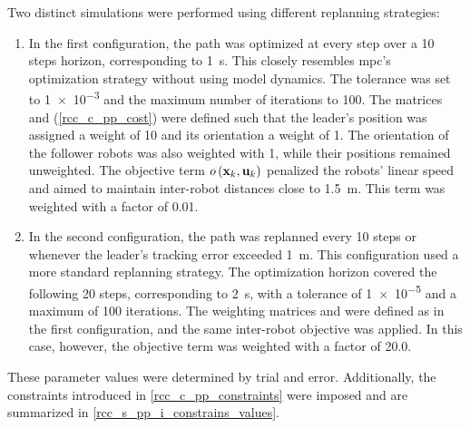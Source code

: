 Two distinct simulations were performed using different replanning strategies:
\begin{enumerate}
	\item In the first configuration, the path was optimized at every step over a \num{10} steps horizon,
	      corresponding to \qty{1}{\second}. This closely resembles \ac{mpc}'s optimization strategy without
	      using model dynamics. The tolerance was set to \num{1e-3} and the maximum number of iterations to
	      \num{100}. The matrices  and  (\cref{rcc_c_pp_cost}) were defined such that the
	      leader's position was assigned a weight of \num{10} and its orientation a weight of \num{1}. The
	      orientation of the follower robots was also weighted with \num{1}, while their positions remained
	      unweighted. The objective term $o\left(\ldvect{x}{k}, \ldvect{u}{k}\right)$ penalized the robots'
	      linear speed and aimed to maintain inter-robot distances close to \qty{1.5}{\m}. This term was
	      weighted with a factor of \num{0.01}.
	\item In the second configuration, the path was replanned every \num{10} steps or whenever the leader's
	      tracking error exceeded \qty{1}{\m}. This configuration used a more standard replanning strategy.
	      The optimization horizon covered the following \num{20} steps, corresponding to \qty{2}{\second},
	      with a tolerance of \num{1e-5} and a maximum of \num{100} iterations. The weighting matrices
	       and  were defined as in the first configuration, and the same inter-robot
	      objective was applied. In this case, however, the objective term was weighted with a factor of
	      \num{20.0}.
\end{enumerate}

These parameter values were determined by trial and error. Additionally, the constraints introduced
in \cref{rcc_c_pp_constraints} were imposed and are summarized in
\cref{rcc_s_pp_i_constrains_values}.

